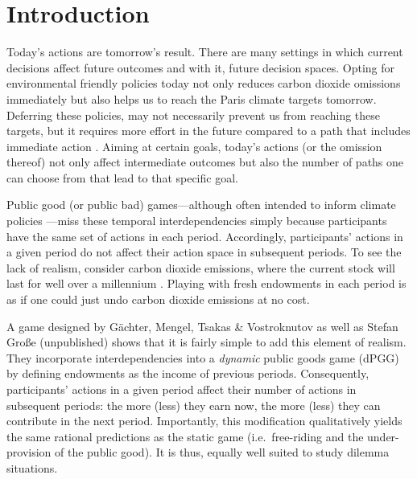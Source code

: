 \documentclass[
  authoryear,
  review,
  3p,
  onecolumn]{elsarticle}
\begin{document}
\hypertarget{sec-intro}{%
\section{Introduction}\label{sec-intro}}

Today's actions are tomorrow's result. There are many settings in which
current decisions affect future outcomes and with it, future decision
spaces. Opting for environmental friendly policies today not only
reduces carbon dioxide omissions immediately but also helps us to reach
the Paris climate targets tomorrow. Deferring these policies, may not
necessarily prevent us from reaching these targets, but it requires more
effort in the future compared to a path that includes immediate action
\citet{HaenselEtAl2022}. Aiming at certain goals, today's actions (or
the omission thereof) not only affect intermediate outcomes but also the
number of paths one can choose from that lead to that specific goal.

Public good (or public bad) games---although often intended to inform
climate policies
\citep[e.g.][]{MilinskiEtAl2006, TavoniEtAl2011, Hauser2014, BrickEtAl2015, GomezEtAl2018, CalzolariEtAl2018, CookEtAl2019}---miss
these temporal interdependencies simply because participants have the
same set of actions in each period. Accordingly, participants' actions
in a given period do not affect their action space in subsequent
periods. To see the lack of realism, consider carbon dioxide emissions,
where the current stock will last for well over a millennium
\citep{Inman2008, CalzolariEtAl2018}. Playing with fresh endowments in
each period is as if one could just undo carbon dioxide emissions at no
cost.

A game designed by Gächter, Mengel, Tsakas \& Vostroknutov \citeyearpar[
hereafter, GMTV]{GMTV2017} as well as Stefan Große (unpublished) shows
that it is fairly simple to add this element of realism. They
incorporate interdependencies into a \emph{dynamic} public goods game
(dPGG) by defining endowments as the income of previous periods.
Consequently, participants' actions in a given period affect their
number of actions in subsequent periods: the more (less) they earn now,
the more (less) they can contribute in the next period. Importantly,
this modification qualitatively yields the same rational predictions as
the static game (i.e.~free-riding and the under-provision of the public
good). It is thus, equally well suited to study dilemma situations.
\end{document}
